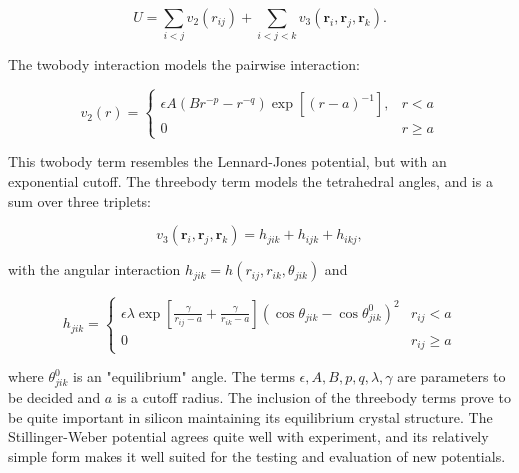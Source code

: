 \begin{equation}
    U = \sum_{i < j} v_2(r_{ij}) + \sum_{i < j < k} v_3(\bm{r}_i, \bm{r}_j, \bm{r}_k) .
\end{equation}

The twobody interaction models the pairwise interaction:

\begin{equation}
    v_2(r) =
    \begin{cases}
        \epsilon A (Br^{-p} - r^{-q}) \exp \left[ (r - a)^{-1} \right],
        & r < a \\
        0 & r \geq a
    \end{cases}
\end{equation}

This twobody term resembles the Lennard-Jones potential,
but with an exponential cutoff.
The threebody term models the tetrahedral angles,
and is a sum over three triplets:

\begin{equation}
    v_3(\bm{r}_i, \bm{r}_j, \bm{r}_k) = h_{jik} + h_{ijk} + h_{ikj} ,
\end{equation}

with the angular interaction $h_{jik} = h(r_{ij}, r_{ik}, \theta_{jik})$ and

\begin{equation}
    h_{jik} =
    \begin{cases}
        \displaystyle\epsilon \lambda \exp \left[ \frac{\gamma}{r_{ij} - a}
        + \frac{\gamma}{r_{ik} - a} \right]
        \left(\cos{\theta_{jik}} - \cos{\theta_{jik}^0} \right)^2 & r_{ij} < a \\[10pt]
        \displaystyle 0 & r_{ij} \geq a
    \end{cases}
\end{equation}

where $\theta_{jik}^0$ is an "equilibrium" angle.
The terms $\epsilon, A, B, p, q, \lambda, \gamma$ are parameters
to be decided and $a$ is a cutoff radius.
The inclusion of the threebody terms prove to be quite important
in silicon maintaining its equilibrium crystal structure.
The Stillinger-Weber potential agrees quite well with experiment,
and its relatively simple form makes it well suited for
the testing and evaluation of new potentials.
